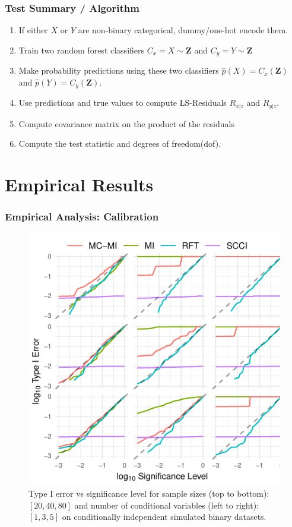 \documentclass{beamer}
\begin{document}
\begin{frame}
	\frametitle{Test Summary / Algorithm}
	\begin{enumerate}
		\setlength\itemsep{1em}
		\item If either $ X $ or $ Y $ are non-binary categorical,
			dummy/one-hot encode them.
		\item Train two random forest classifiers $ C_x = X \sim \bm{Z} $ and
			$ C_y = Y \sim \bm{Z} $
		\item Make probability predictions using these two classifiers
			$ \hat{p}(X) = C_x(\bm{Z}) $ and $ \hat{p}(Y) =
			C_y(\bm{Z}) $.
		\item Use predictions and true values to compute LS-Residuals $ R_{x|z} $ and $ R_{y|z} $.	
		\item Compute covariance matrix on the product of the residuals
		\item Compute the test statistic and degrees of freedom(dof).
	\end{enumerate}
\end{frame}

\section{Empirical Results}

\begin{frame}
	\frametitle{Empirical Analysis: Calibration}
	\begin{figure}
		\centering
		\includegraphics[scale=0.8]{imgs/calibration_add_vars.pdf}
		\caption*{Type I error vs significance level for sample sizes (top to
		bottom): $ [20, 40, 80] $ and number of conditional variables (left to
		right): $ [1, 3, 5] $ on conditionally independent simulated binary
		datasets.}
	\end{figure}
\end{frame}
\end{document}
